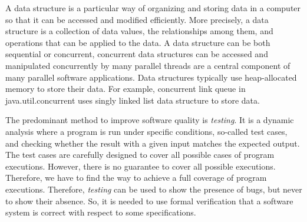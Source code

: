 A data structure is a particular way of organizing and storing data in a computer so that it can be accessed and modified efficiently. More precisely, a data structure is a collection of data values, the relationships among them, and operations that can be applied to the data. 
A data structure can be both sequential or concurrent, concurrent data structures can be accessed and manipulated concurrently by many parallel threads are a central component of many parallel software applications. 
Data structures typically use heap-allocated memory to store their data. For example, concurrent link queue in java.util.concurrent uses singly linked list data structure to store data.   





The predominant method to improve software quality is
\emph{testing}. It is a dynamic analysis where a program is run under specific conditions, so-called test cases, and checking
whether the result with a given input matches the expected output.
%
The test cases are carefully designed to cover all possible cases of program executions.
%
However, there is no guarantee to cover all possible executions. Therefore, we have to find the way to achieve a full coverage of program executions. Therefore, \emph{testing} can be used to show the presence of bugs, but never to show their absence. So, it is needed to use formal verification that a software system is correct with respect to some specifications. %
%


